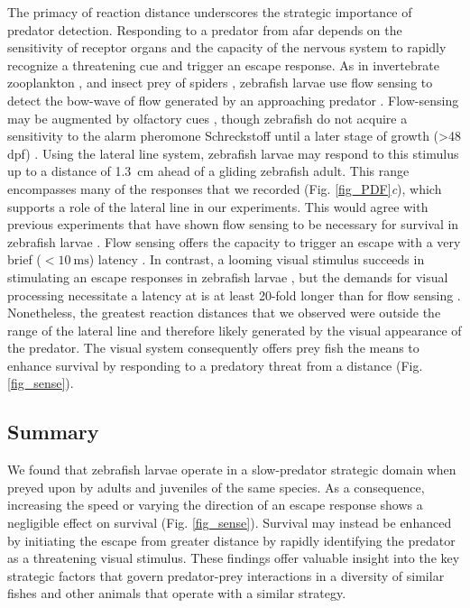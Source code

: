 \documentclass[]{rsos}%
\begin{document}
The primacy of reaction distance underscores the strategic importance of predator detection. 
Responding to a predator from afar depends on the sensitivity of receptor organs and the capacity of the nervous system to rapidly recognize a threatening cue and trigger an escape response.
As in invertebrate zooplankton \cite{Heuch:2007kk}, and insect prey of spiders \cite{Casas:2014bn,Dangles:2006vo}, zebrafish larvae use flow sensing to detect the bow-wave of flow generated by an approaching predator \cite{Stewart:2013bha}.
Flow-sensing may be augmented by olfactory cues \cite{Waldman:1982ic}, though zebrafish do not acquire a sensitivity to the alarm pheromone Schreckstoff until a later stage of growth (>48 dpf) \cite{Waldman:1982ic}.
Using the lateral line system, zebrafish larvae may respond to this stimulus up to a distance of \SI{1.3}{\cm} \cite{Stewart:2014cma} ahead of a gliding zebrafish adult.
This range encompasses many of the responses that we recorded (Fig. \ref{fig_PDF}\textit{c}), which supports a role of the lateral line in our experiments.
This would agree with previous experiments that have shown flow sensing to be necessary for survival in zebrafish larvae \cite{Stewart:2013bha}.
Flow sensing offers the capacity to trigger an escape with a very brief ($< \SI{10}{\ms}$) latency  \cite{Liu:1999fs}.
In contrast, a looming visual stimulus succeeds in stimulating an escape responses in zebrafish larvae \cite{Bianco:2011ca}, but the demands for visual processing necessitate a latency at is at least 20-fold longer than for flow sensing \cite{Burgess:2007vp}. 
Nonetheless, the greatest reaction distances that we observed were outside the range of the lateral line and therefore likely generated by the visual appearance of the predator.
The visual system consequently offers prey fish the means to enhance survival by responding to a predatory threat from a distance (Fig. \ref{fig_sense}).


\subsection*{Summary} 

We found that zebrafish larvae operate in a slow-predator strategic domain when preyed upon by adults and juveniles of the same species.
As a consequence, increasing the speed or varying the direction of an escape response shows a negligible effect on survival (Fig. \ref{fig_sense}).
Survival may instead be enhanced by initiating the escape from greater distance by rapidly identifying the predator as a threatening visual stimulus.  
These findings offer valuable insight into the key strategic factors that govern predator-prey interactions in a diversity of similar fishes and other animals that operate with a similar strategy. 
\end{document}

